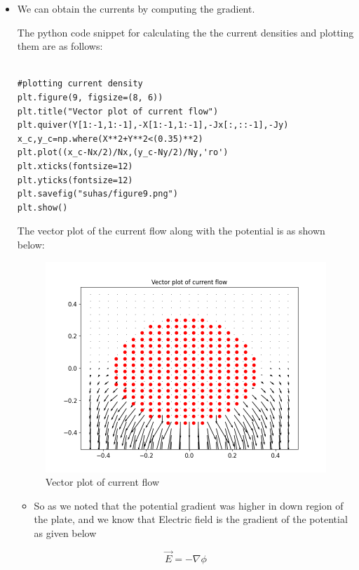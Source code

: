 \documentclass[11pt, a4paper]{article}
\begin{document}
\begin{itemize}
\item
  We can obtain the currents by computing the gradient.

  
The python code snippet for calculating the the current densities and plotting them are as follows:
   
  
\begin{verbatim}

#plotting current density
plt.figure(9, figsize=(8, 6))
plt.title("Vector plot of current flow")
plt.quiver(Y[1:-1,1:-1],-X[1:-1,1:-1],-Jx[:,::-1],-Jy)
x_c,y_c=np.where(X**2+Y**2<(0.35)**2)
plt.plot((x_c-Nx/2)/Nx,(y_c-Ny/2)/Ny,'ro')
plt.xticks(fontsize=12)
plt.yticks(fontsize=12)
plt.savefig("suhas/figure9.png")
plt.show()
  \end{verbatim}
  \newpage
The vector plot of the current flow along with the potential is as shown below:

  \begin{figure}[!tbh]
   \centering
   \includegraphics[scale=0.8]{Figure9.png}  
   \caption{Vector plot of current flow}
  \end{figure}
  

  \begin{itemize}
  \item
    So as we noted that the potential gradient was higher in down region
    of the plate, and we know that Electric field is the gradient of the
    potential as given below
  \end{itemize}
  
  \begin{equation}
  \vec{E} = -\nabla{\phi}
     \end{equation}
  

\end{itemize}
\end{document}
